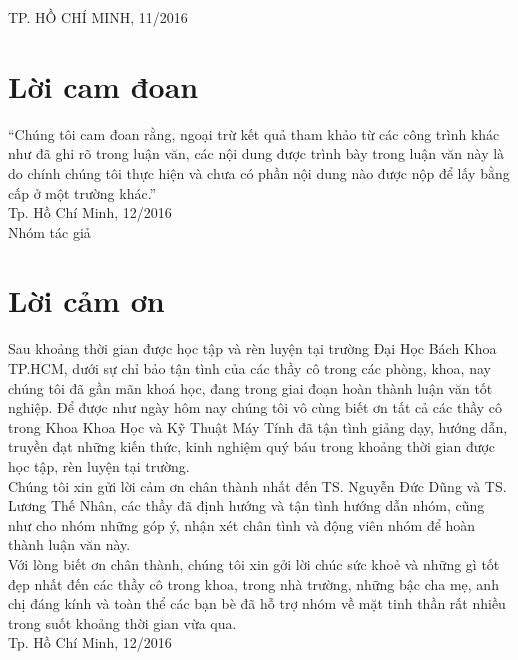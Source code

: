 \documentclass[12pt,a4paper,oneside]{extbook}
\begin{document}
\begin{titlepage}
\begin{center}
{\footnotesize TP. HỒ CHÍ MINH, 11/2016}
\end{center}
\end{titlepage}

\chapter*{Lời cam đoan}

“Chúng tôi cam đoan rằng, ngoại trừ kết quả tham khảo từ các công trình khác như đã ghi rõ trong luận văn, các nội dung được trình bày trong luận văn này là do chính chúng tôi thực hiện và chưa có phần nội dung nào được nộp để lấy bằng cấp ở một trường khác.”\\

\hspace{10cm}Tp. Hồ Chí Minh, 12/2016\\

\hspace{11cm}Nhóm tác giả

\chapter*{Lời cảm ơn}
Sau khoảng thời gian được học tập và rèn luyện tại trường Đại Học Bách Khoa TP.HCM, dưới sự chỉ bảo tận tình của các thầy cô trong các phòng, khoa, nay chúng tôi đã gần mãn khoá học, đang trong giai đoạn hoàn thành luận văn tốt nghiệp. Để được như ngày hôm nay chúng tôi vô cùng biết ơn tất cả các thầy cô trong Khoa Khoa Học và Kỹ Thuật Máy Tính đã tận tình giảng dạy, hướng dẫn, truyền đạt những kiến thức, kinh nghiệm quý báu trong khoảng thời gian được học tập, rèn luyện tại trường.\\

\noindent
Chúng tôi xin gửi lời cảm ơn chân thành nhất đến TS. Nguyễn Đức Dũng và TS. Lương Thế Nhân, các thầy đã định hướng và tận tình hướng dẫn nhóm, cũng như cho nhóm những góp ý, nhận xét chân tình và động viên nhóm để hoàn thành luận văn này.\\

\noindent
Với lòng biết ơn chân thành, chúng tôi xin gởi lời chúc sức khoẻ và những gì tốt đẹp nhất đến các thầy cô trong khoa, trong nhà trường, những bậc cha mẹ, anh chị đáng kính và toàn thể các bạn bè đã hỗ trợ nhóm về mặt tinh thần rất nhiều trong suốt khoảng thời gian vừa qua.\\

\hspace{10cm}Tp. Hồ Chí Minh, 12/2016\\
\end{document}
